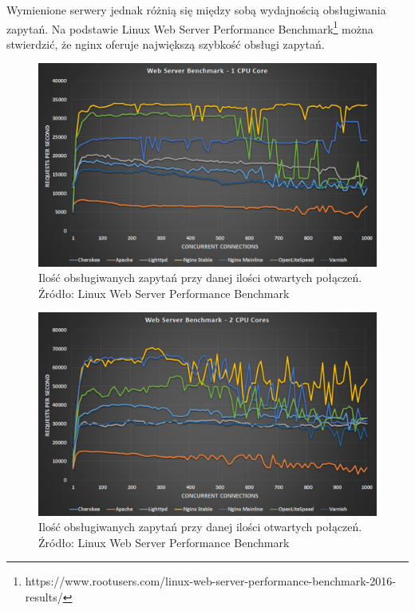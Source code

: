 \documentclass{report}
\begin{document}
			Wymienione serwery jednak różnią się między sobą wydajnością obsługiwania zapytań. Na podstawie Linux Web Server Performance Benchmark\footnote{https://www.rootusers.com/linux-web-server-performance-benchmark-2016-results/} można stwierdzić, że nginx oferuje największą szybkość obsługi zapytań.
	
			\begin{center}
				\begin{figure}[ht]
					\centering
					\includegraphics[scale=0.35]{web-server-performance-benchmark-1-cpu-core-1.jpg}
					\caption{Ilość obsługiwanych zapytań przy danej ilości otwartych połączeń. Źródło: Linux Web Server Performance Benchmark}
				\end{figure}
			\end{center}

			\begin{center}
				\begin{figure}[ht]
					\centering
					\includegraphics[scale=0.35]{web-server-performance-benchmark-2-cpu-cores-2.jpg}
					\caption{Ilość obsługiwanych zapytań przy danej ilości otwartych połączeń. Źródło: Linux Web Server Performance Benchmark}
				\end{figure}
			\end{center}
		
\end{document}
